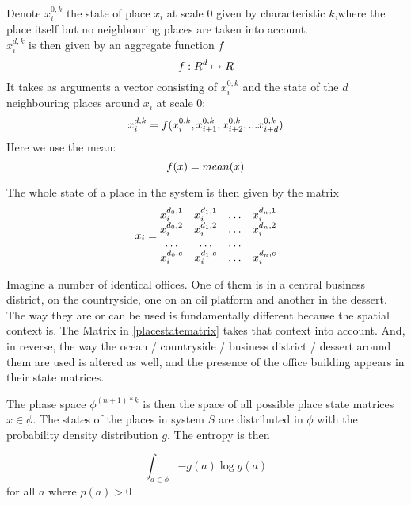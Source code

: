 \documentclass[fleqn,10pt]{wlscirep}
\begin{document}
\bigskip
\\Denote $x_i^{0,k}$ the state of place $x_i$ at scale $0$ given by characteristic $k$,where the place itself but no neighbouring places are taken into account.
\\$x_i^{d,k}$ is then given by an aggregate function $f$ 
\begin{equation}
\label{generic_aggregate_function}
f: R^d \mapsto R$$
\end{equation}
It takes as arguments a vector consisting of $x_i^{0,k}$ and the state of the $d$ neighbouring places around $x_i$ at scale $0$:
\begin{equation}
\label{multiscale_vector}
x_i^{d,k} = f(x_i^{0,k},x_{i+1}^{0,k},x_{i+2}^{0,k},...x_{i+d}^{0,k})$$
\end{equation}
Here we use the mean:
\begin{equation}
\label{aggregate_function_mean}
f(x) = mean(x)$$	
\end{equation}
\bigskip

\bigskip
The whole state of a place in the system is then given by the matrix
\begin{equation}
\label{placestatematrix}
x_i = \begin{matrix}
x_i^{d_0,1} & x_i^{d_1,1} & \ldots & x_i^{d_n,1}\cr
x_i^{d_0,2} & x_i^{d_1,2} & \ldots & x_i^{d_n,2}\cr
\ldots &\ldots & \ldots& \cr
x_i^{d_0,c} & x_i^{d_1,c} & \ldots & x_i^{d_n,c}\cr
\end{matrix}
\end{equation}

Imagine a number of identical offices. One of them is in a central business district, on the countryside, one on an oil platform and another in the dessert. The way they are or can be used is fundamentally different because the spatial context is. The Matrix in \ref{placestatematrix} takes that context into account. And, in reverse, the way the ocean / countryside / business district / dessert around them are used is altered as well, and the presence of the office building appears in their state matrices.



The phase space $\phi^{(n+1)*k}$ is then the space of all possible place state matrices $x \in \phi$.
The states of the places in system $S$ are distributed in $\phi$ with the probability density distribution
$g$. The entropy is then 

$$\int_{a \in \phi}{- g(a) \log{g(a)}}$$
for all $a$ where $p(a)>0$

\bigskip
\end{document}

